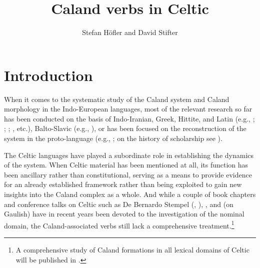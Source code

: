 \documentclass[output=paper,colorlinks,citecolor=brown]{langscibook}
\author{Stefan Höfler%
\affiliation{University of Vienna} and David Stifter%
\affiliation{Maynooth University}}
\title{Caland verbs in Celtic}
\begin{document}
\maketitle

\section{Introduction}
\label{sec:Celticintro}

When it comes to the systematic study of the Caland system  and Caland morphology in the Indo-European languages, most of the relevant research so far has been conducted on the basis of Indo-Iranian, Greek, Hittite, and Latin (e.g., \citealt{Nussbaum1976}; \citealt{Rau2009}; \citealt{Rau2013}; \citealt{Lowe2016}, etc.), Balto-Slavic (e.g., \citealt{Majer2017}), or has been focused on the reconstruction of the system in the proto-language (e.g., \citealt{Bozzone2016}; on the history of scholarship see \citealt{DellOro2015}).  

The Celtic languages have played a subordinate role in establishing the dynamics of the system. When Celtic material has been mentioned at all, its function has been ancillary rather than constitutional, serving as a means to provide evidence for an already established framework rather than being exploited to gain new insights into the Caland complex   as a whole. And while a couple of book chapters and conference talks on Celtic such as De Bernardo Stempel (\citeyear[529--537]{Stempel1999}, \citeyear{Stempel2003}), \citet{Höfler2016}, and \citet{Kahl2018} (on Gaulish) have in recent years been devoted to the investigation of the nominal domain, the Caland-associated verbs   still lack a comprehensive treatment.\footnote{A comprehensive study of Caland formations   in all lexical domains of Celtic will be published in \citet{HöflerStifterforth}.}
\end{document}
